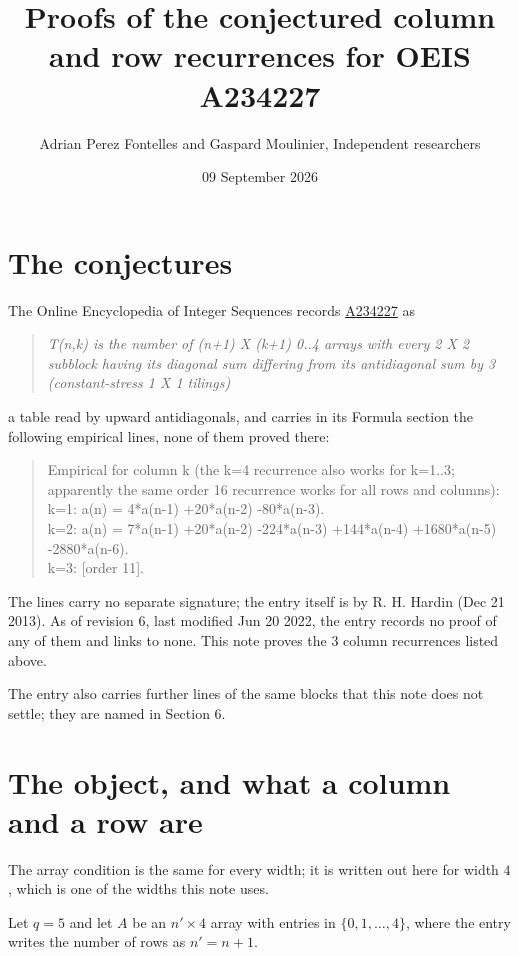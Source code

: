 \documentclass[11pt]{article}
\title{Proofs of the conjectured column and row recurrences for OEIS A234227}
\author{Adrian Perez Fontelles and Gaspard Moulinier, Independent researchers}
\date{09 September 2026}
\theoremstyle{definition}
\begin{document}
\maketitle
\section{The conjectures}

The Online Encyclopedia of Integer Sequences records \href{https://oeis.org/A234227}{A234227} as

\begin{quote}\itshape T(n,k) is the number of (n+1) X (k+1) 0..4 arrays with every 2 X 2 subblock having its diagonal sum differing from its antidiagonal sum by 3 (constant-stress 1 X 1 tilings)\end{quote}

a table read by upward antidiagonals, and carries in its Formula section the following empirical lines, none of them proved there:

\begin{quote}\ttfamily Empirical for column k (the k=4 recurrence also works for k=1..3; apparently the same order 16 recurrence works for all rows and columns):\\
k=1: a(n) = 4*a(n-1) +20*a(n-2) -80*a(n-3).\\k=2: a(n) = 7*a(n-1) +20*a(n-2) -224*a(n-3) +144*a(n-4) +1680*a(n-5) -2880*a(n-6).\\k=3: [order 11].\end{quote}

The lines carry no separate signature; the entry itself is by R. H. Hardin (Dec 21 2013). As of revision 6, last modified Jun 20 2022, the entry records no proof of any of them and links to none. This note proves the 3 column recurrences listed above.

The entry also carries further lines of the same blocks that this note does not settle; they are named in Section 6.

\section{The object, and what a column and a row are}

The array condition is the same for every width; it is written out here for width $4$, which is one of the widths this note uses.

Let $q = 5$ and let $A$ be an $n' \times 4$ array with entries in $\{0,1,\dots,4\}$, where the entry writes the number of rows as $n' = n + 1$.
\end{document}
